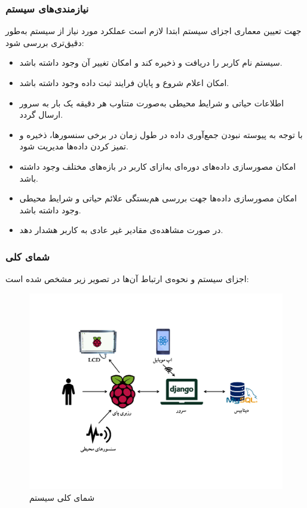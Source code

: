 \documentclass[12pt]{article}
\begin{document}
\subsubsection{نیازمندی‌های سیستم}
جهت تعیین معماری اجزای سیستم ابتدا لازم است عملکرد مورد نیاز از سیستم به‌طور دقیق‌تری بررسی شود:
\begin{itemize}
	\item سیستم نام کاربر را دریافت و ذخیره کند و امکان تغییر آن وجود داشته باشد.
	\item امکان اعلام شروع و پایان فرایند ثبت داده وجود داشته باشد.
	\item اطلاعات حیاتی و شرایط محیطی به‌صورت متناوب هر دقیقه یک بار به سرور ارسال گردد.
	\item با توجه به پیوسته نبودن جمع‌آوری داده در طول زمان در برخی سنسورها، ذخیره و تمیز کردن داده‌ها مدیریت شود.
	\item امکان مصورسازی داده‌های دوره‌ای به‌ازای کاربر در بازه‌های مختلف وجود داشته باشد.
	\item امکان مصورسازی داده‌ها جهت بررسی هم‌بستگی علائم حیاتی و شرایط محیطی وجود داشته باشد.
	\item در صورت مشاهده‌ی مقادیر غیر عادی به کاربر هشدار دهد.
\end{itemize}

\subsubsection{شمای کلی}
اجزای سیستم و نحوه‌ی ارتباط آن‌ها در تصویر زیر مشخص شده است:
\begin{figure}[h]
	\begin{center}
		\includegraphics[width=\textwidth,trim={1cm 4cm 1cm 4cm},clip]{project_architecture}
	\end{center}
	\caption{شمای کلی سیستم}
\end{figure}
\end{document}
